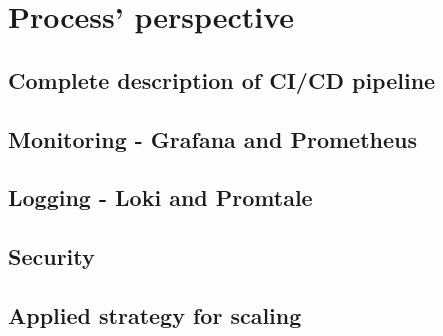 \section{Process' perspective}
\subsection{Complete description of CI/CD pipeline}
\subsection{Monitoring - Grafana and Prometheus}
\subsection{Logging - Loki and Promtale}
\subsection{Security}
\subsection{Applied strategy for scaling}